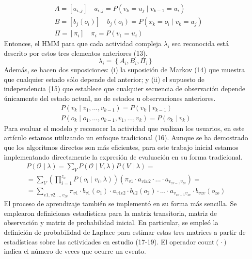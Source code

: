 \documentclass[10pt]{article}
\begin{document}
$$
\begin{aligned}
& A=\left[a_{i, j}\right] \quad a_{i, j}=P\left(v_{k}=u_{j} \mid v_{k-1}=u_{i}\right) \\
& B=\left[b_{j}\left(o_{i}\right)\right] \quad b_{j}\left(o_{i}\right)=P\left(x_{k}=o_{i} \mid v_{k}=u_{j}\right) \\
& \Pi=\left[\pi_{i}\right] \quad \pi_{i}=P\left(v_{1}=u_{i}\right)
\end{aligned}
$$
Entonces, el HMM para que cada actividad compleja $\lambda_{i}$ sea reconocida está descrito por estos tres elementos anteriores (13).
$$
\lambda_{i}=\left\{A_{i}, B_{i}, \Pi_{\mathrm{i}}\right\}
$$
Además, se hacen dos suposiciones: (i) la suposición de Markov (14) que muestra que cualquier estado sólo depende del anterior; y (ii) el supuesto de independencia (15) que establece que cualquier secuencia de observación depende únicamente del estado actual, no de estados u observaciones anteriores.
$$
\begin{gathered}
P\left(v_{k} \mid v_{1}, \ldots, v_{k-1}\right)=P\left(v_{k} \mid v_{k-1}\right) \\
P\left(o_{k} \mid o_{1}, \ldots, o_{k-1}, v_{1}, \ldots, v_{k}\right)=P\left(o_{k} \mid v_{k}\right)
\end{gathered}
$$
Para evaluar el modelo y reconocer la actividad que realizan los usuarios, en este artículo estamos utilizando un enfoque tradicional (16). Aunque se ha demostrado que los algoritmos directos son más eficientes, para este trabajo inicial estamos implementando directamente la expresión de evaluación en su forma tradicional.
$$
\begin{gathered}
P(\mathcal{O} \mid \lambda)=\sum_{V} P(\mathcal{O} \mid V, \lambda) P(V \mid \lambda)= \\
=\sum_{V}\left(\prod_{i=1}^{z_{o}} P\left(o_{i} \mid v_{i}, \lambda\right)\right)\left(\pi_{v 1} \cdot a_{v 1 v 2} \cdot \ldots \cdot a_{v_{z v-1} v_{z v}}\right)= \\
=\sum_{v 1, v 2, . ., v_{z v}} \pi_{v 1} \cdot b_{v 1}\left(o_{1}\right) \cdot a_{v 1 v 2} \cdot b_{v 2}\left(o_{2}\right) \cdot \ldots \cdot a_{v_{z v-1} v_{z v}} \cdot b_{v z v}\left(o_{z o}\right)
\end{gathered}
$$
El proceso de aprendizaje también se implementó en su forma más sencilla. Se emplearon definiciones estadísticas para la matriz transitoria, matriz de observación y matriz de probabilidad inicial. En particular, se empleó la definición de probabilidad de Laplace para estimar estas tres matrices a partir de estadísticas sobre las actividades en estudio (17-19). El operador count$(\cdot)$ indica el número de veces que ocurre un evento.
\end{document}
